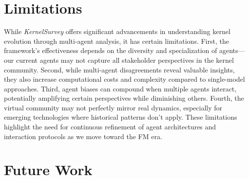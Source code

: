 \section{Limitations}
\label{sec:limitations}

While \emph{KernelSurvey} offers significant advancements in understanding kernel evolution through multi-agent analysis, it has certain limitations. First, the framework's effectiveness depends on the diversity and specialization of agents—our current agents may not capture all stakeholder perspectives in the kernel community. Second, while multi-agent disagreements reveal valuable insights, they also increase computational costs and complexity compared to single-model approaches. Third, agent biases can compound when multiple agents interact, potentially amplifying certain perspectives while diminishing others. Fourth, the virtual community may not perfectly mirror real dynamics, especially for emerging technologies where historical patterns don't apply. These limitations highlight the need for continuous refinement of agent architectures and interaction protocols as we move toward the FM era.

\section{Future Work}
\label{sec:future}

